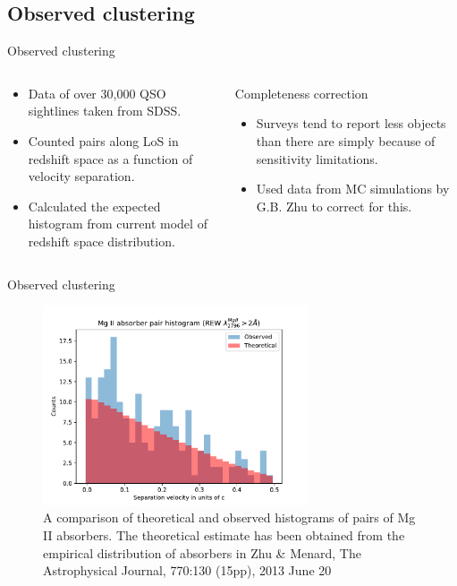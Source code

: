 \documentclass{beamer}
\begin{document}
	\subsection{Observed clustering}
		\begin{frame}{Observed clustering}
			\begin{columns}
				\begin{column}{0.35\textwidth}
					\begin{itemize}
						\item Data of over 30,000 QSO sightlines taken from SDSS.
						\item Counted pairs along LoS in redshift space as a function of velocity separation.
						\item Calculated the expected histogram from current model of redshift space distribution.
					\end{itemize}
				\end{column}
				\begin{column}{0.6\textwidth}
					\begin{block}{Completeness correction}
						\begin{itemize}
							\item Surveys tend to report less objects than there are simply because of sensitivity limitations.
							\item Used data from MC simulations by G.B. Zhu to correct for this. 
						\end{itemize}
					\end{block}
				\end{column}
			\end{columns}
		\end{frame}
		\begin{frame}{Observed clustering}
			\begin{figure}
				\includegraphics[width=0.7\textwidth]{MgII_2.pdf}
				\caption{\tiny A comparison of theoretical and observed histograms of pairs of Mg II absorbers. The theoretical estimate has been obtained from the empirical distribution of absorbers in  Zhu \& Menard, The Astrophysical Journal, 770:130 (15pp), 2013 June 20}
				\label{fig:cluster}
			\end{figure}
		\end{frame}
\end{document}
